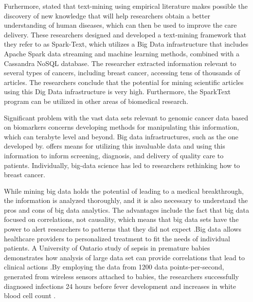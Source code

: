 \documentclass[sigconf]{acmart}
\begin{document}
Furhermore, \cite{ye2016} stated that text-mining using empirical literature makes possible the discovery of new knowledge that will help researchers obtain a better understanding of human diseases, which can then be used to improve the care delivery. These researchers designed and developed a text-mining framework that they refer to as Spark-Text, which utilizes a Big Data infrastructure that includes Apache Spark data streaming and machine learning methods, combined with a Cassandra NoSQL database\cite{ye2016}.  The researcher extracted information relevant to several types of cancers, including breast cancer, accessing tens of thousands of articles. The researchers conclude that the potential for mining scientific articles using this Dig Data infrastructure is very high\cite{ye2016}.  Furthermore, the SparkText program can be utilized in other areas of biomedical research\cite{ye2016}.

Significant problem with the vast data sets relevant to genomic cancer data based on biomarkers concerns developing methods for manipulating this information, which can terabyte level and beyond. Big data infrastructures, such as the one developed by\cite{ye2016}.  offers means for utilizing this invaluable data and using this information to inform screening, diagnosis, and delivery of quality care to patients.  Individually, big-data science has led to researchers rethinking how to breast cancer\cite{adams}.

While mining big data holds the potential of leading to a medical breakthrough, the information is analyzed thoroughly, and it is also necessary to understand the pros and cons of big data analytics\cite{bottles2014}.  The advantages include the fact that big data focused on correlations, not causality, which means that big data sets have the power to alert researchers to patterns that they did not expect \cite{bottles2014}.Big data allows healthcare providers to personalized treatment to fit the needs of individual patients. A University of Ontario study of sepsis in premature babies demonstrates how analysis of large data set can provide correlations that lead to clinical actions \cite{bottles2014}.By employing the data from 1200 data points-per-second, generated from wireless sensors attached to babies, the researchers successfully diagnosed infections 24 hours before fever development and increases in white blood cell count \cite{bottles2014}.
\end{document}
